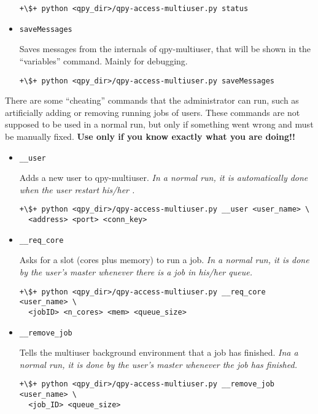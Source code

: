\documentclass[a4paper,12pt]{article}
\begin{document}
\begin{itemize}
  \begin{lstlisting}[style=BashStyle]
+\$+ python <qpy_dir>/qpy-access-multiuser.py status
  \end{lstlisting}



\item \texttt{saveMessages}

  Saves messages from the internals of qpy-multiuser, that will be shown in the ``variables'' command.
  Mainly for debugging.

  \begin{lstlisting}[style=BashStyle]
+\$+ python <qpy_dir>/qpy-access-multiuser.py saveMessages
  \end{lstlisting}


\end{itemize}

There are some ``cheating'' commands that the administrator can run, such as artificially adding or removing running jobs of users.
These commands are not supposed to be used in a normal run, but only if something went wrong and must be manually fixed.
\textbf{Use only if you know exactly what you are doing!!}


\begin{itemize}

\item \texttt{\_\_user}

  Adds a new user to qpy-multiuser. \emph{In a normal run, it is automatically done when the user restart his/her \qpy{}.}

  \begin{lstlisting}[style=BashStyle]
+\$+ python <qpy_dir>/qpy-access-multiuser.py __user <user_name> \
  <address> <port> <conn_key>
  \end{lstlisting}


\item \texttt{\_\_req\_core}

  Asks for a slot (cores plus memory) to run a job. \emph{In a normal run, it is done by the user's master whenever there is a job in his/her queue.}
  
\begin{lstlisting}[style=BashStyle]
+\$+ python <qpy_dir>/qpy-access-multiuser.py __req_core <user_name> \
  <jobID> <n_cores> <mem> <queue_size>
\end{lstlisting}

\item \texttt{\_\_remove\_job}

  Tells the multiuser background environment that a job has finished. \emph{Ina a normal run, it is done by the user's master whenever the job has finished.}
  
\begin{lstlisting}[style=BashStyle]
+\$+ python <qpy_dir>/qpy-access-multiuser.py __remove_job <user_name> \
  <job_ID> <queue_size>
\end{lstlisting}

\end{itemize}
\end{document}
